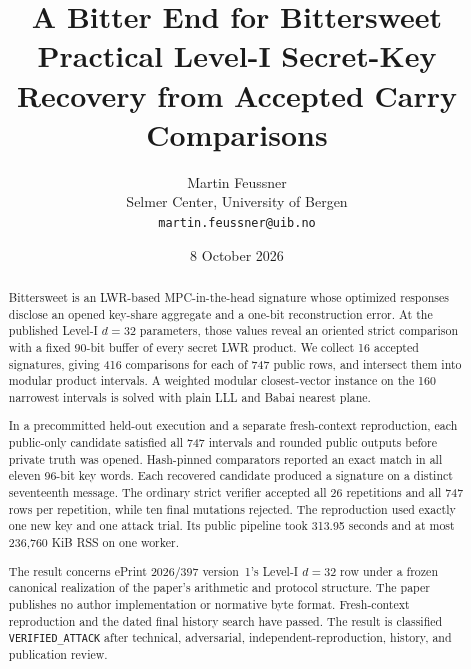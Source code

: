 \documentclass[10pt,a4paper]{article}
\title{\bfseries A Bitter End for Bittersweet\\
\large Practical Level-I Secret-Key Recovery from Accepted Carry Comparisons}
\author{Martin Feussner\\
\small Selmer Center, University of Bergen\\
\small \texttt{martin.feussner@uib.no}}
\date{8 October 2026}
\begin{document}
\maketitle

\begin{center}
\end{center}
\vspace{0.7em}

\begin{abstract}
Bittersweet is an LWR-based MPC-in-the-head signature whose optimized
responses disclose an opened key-share aggregate and a one-bit reconstruction
error.  At the published Level-I $d=32$ parameters, those values reveal an
oriented strict comparison with a fixed 90-bit buffer of every secret LWR
product.  We collect 16 accepted signatures, giving 416 comparisons for each
of 747 public rows, and intersect them into modular product intervals.  A
weighted modular closest-vector instance on the 160 narrowest intervals is
solved with plain LLL and Babai nearest plane.

In a precommitted held-out execution and a separate fresh-context reproduction,
each public-only candidate satisfied all 747 intervals and rounded public
outputs before private truth was opened.  Hash-pinned comparators reported an
exact match in all eleven 96-bit key words.  Each recovered candidate produced
a signature on a distinct seventeenth message.  The ordinary strict verifier
accepted all 26 repetitions and all 747 rows per repetition, while ten final
mutations rejected.  The reproduction used exactly one new key and one attack
trial.  Its public pipeline took 313.95 seconds and at most 236,760 KiB RSS on
one worker.

The result concerns ePrint 2026/397 version~1's Level-I $d=32$ row under a
frozen canonical realization of the paper's arithmetic and protocol structure.
The paper publishes no author implementation or normative byte format.
Fresh-context reproduction and the dated final history search have passed.
The result is classified \texttt{VERIFIED\_ATTACK} after technical,
adversarial, independent-reproduction, history, and publication review.
\end{abstract}
\end{document}
